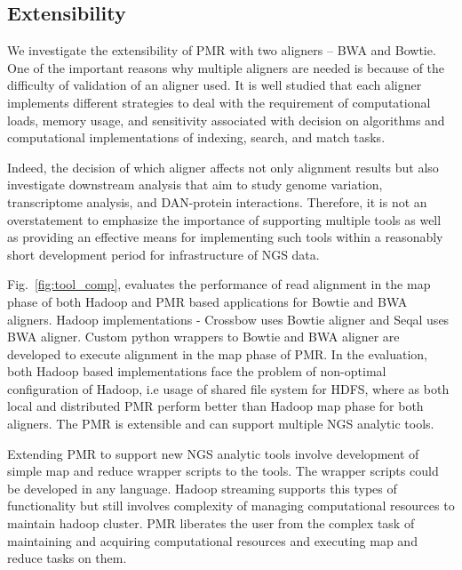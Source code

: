 \documentclass{acm_proc_article-sp}
\begin{document}
\subsection{Extensibility}



We investigate the extensibility of PMR with two aligners -- BWA and
Bowtie.  One of the important reasons why multiple aligners are needed
is because of the difficulty of validation of an aligner used.  It is
well studied that each aligner implements different strategies to deal
with the requirement of computational loads, memory usage, and
sensitivity associated with decision on algorithms and computational
implementations of indexing, search, and match
tasks\cite{mapping-survey}.

Indeed, the decision of which aligner affects not only alignment
results but also investigate downstream analysis that aim to study
genome variation, transcriptome analysis, and DAN-protein
interactions. Therefore, it is not an overstatement to emphasize the
importance of supporting multiple tools as well as providing an
effective means for implementing such tools within a reasonably short
development period for infrastructure of NGS data.

Fig.~\ref{fig:tool_comp}, evaluates the performance of read alignment
in the map phase of both Hadoop and PMR based applications for Bowtie
and BWA aligners. Hadoop implementations - Crossbow uses Bowtie
aligner and Seqal uses BWA aligner.  Custom python wrappers to Bowtie
and BWA aligner are developed to execute alignment in the map phase of
PMR. In the evaluation, both Hadoop based implementations face the
problem of non-optimal configuration of Hadoop, i.e usage of shared
file system for HDFS, where as both local and distributed PMR perform
better than Hadoop map phase for both aligners. The PMR is extensible
and can support multiple NGS analytic tools.

Extending PMR to support new NGS analytic tools involve development of
simple map and reduce wrapper scripts to the tools. The wrapper
scripts could be developed in any language.  Hadoop streaming supports
this types of functionality but still involves complexity of managing
computational resources to maintain hadoop cluster.  PMR liberates the
user from the complex task of maintaining and acquiring computational
resources and executing map and reduce tasks on them.
\end{document}

